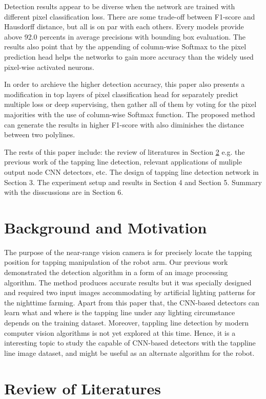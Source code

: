 \documentclass[default,pdflatex,iicol]{sn-jnl}%
\begin{document}
Detection results appear to be diverse when the network are trained with different pixel classification loss. There are some trade-off between F1-score and Hausdorff distance, but all is on par with each others. Every models provide above 92.0 percents in average precisions with bounding box evaluation. The results also point that by the appending of column-wise Softmax to the pixel prediction head helps the networks to gain more accuracy than the widely used pixel-wise activated neurons. 

In order to archieve the higher detection accuracy, this paper also presents a modification in top layers of pixel classification head for separately predict multiple loss or deep supervising, then gather all of them by voting for the pixel majorities with the use of column-wise Softmax function. The proposed method can generate the results in higher F1-score with also diminishes the distance between two polylines.

The rests of this paper include: the review of literatures in Section \ref{sec-review} \textemdash e.g. the previous work of the tapping line detection, relevant applications of muliple output node CNN detectors, etc. The design of tapping line detection network in Section 3. The experiment setup and results in Section 4 and Section 5. Summary with the disscussions are in Section 6.

\section{Background and Motivation}\label{sec-background}
The purpose of the near-range vision camera is for precisely locate the tapping position for tapping manipulation of the robot arm. Our previous work \cite{Wongtanawijit_2021} demonstrated the detection algorithm in a form of an image processing algorithm. The method produces accurate results but it was specially designed and required two input images accommodating by artificial lighting patterns for the nighttime farming. Apart from this paper that, the CNN-based detectors can learn what and where is the tapping line under any lighting circumstance depends on the training dataset. Moreover, tappling line detection by modern computer vision algorithms is not yet explored at this time. Hence, it is a interesting topic to study the capable of CNN-based detectors with the tappline line image dataset, and might be useful as an alternate algorithm for the robot.

\section{Review of Literatures}\label{sec-review}
\end{document}
